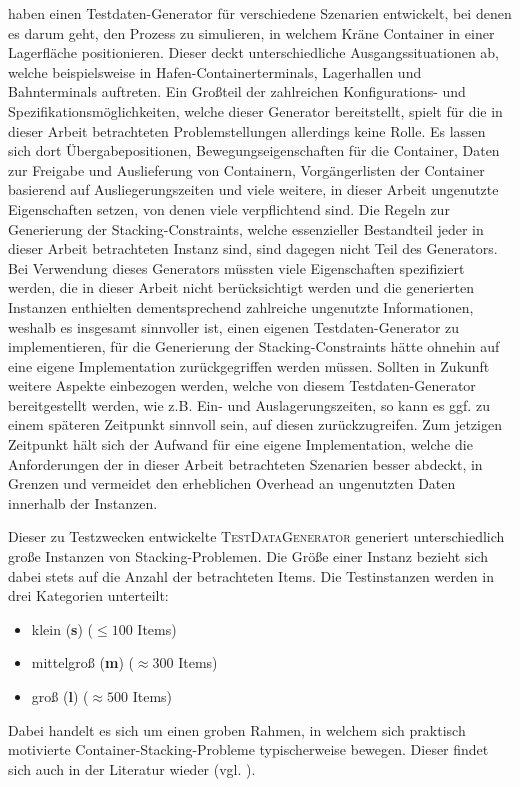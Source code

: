 \citet{Briskorn2018} haben einen Testdaten-Generator für verschiedene Szenarien entwickelt, bei denen
es darum geht, den Prozess zu simulieren, in welchem Kräne Container in einer Lagerfläche positionieren.
Dieser deckt unterschiedliche Ausgangssituationen ab, welche beispielsweise in Hafen-Containerterminals,
Lagerhallen und Bahnterminals auftreten.
Ein Großteil der zahlreichen Konfigurations- und Spezifikationsmöglichkeiten, welche dieser
Generator bereitstellt, spielt für die in dieser Arbeit betrachteten Problemstellungen allerdings keine Rolle.
Es lassen sich dort Übergabepositionen, Bewegungseigenschaften für die Container, Daten zur Freigabe und Auslieferung von
Containern, Vorgängerlisten der Container basierend auf Ausliegerungszeiten und viele weitere, in dieser Arbeit
ungenutzte Eigenschaften setzen, von denen viele verpflichtend sind. Die Regeln zur Generierung der Stacking-Constraints,
welche essenzieller Bestandteil jeder in dieser Arbeit betrachteten Instanz sind, sind dagegen nicht Teil des Generators.
Bei Verwendung dieses Generators müssten viele Eigenschaften spezifiziert werden, die in dieser Arbeit nicht
berücksichtigt werden und die generierten Instanzen enthielten dementsprechend zahlreiche ungenutzte Informationen,
weshalb es insgesamt sinnvoller ist, einen eigenen Testdaten-Generator zu implementieren, für die Generierung der
Stacking-Constraints hätte ohnehin auf eine eigene Implementation zurückgegriffen werden müssen.
Sollten in Zukunft weitere Aspekte einbezogen werden, welche von diesem Testdaten-Generator bereitgestellt
werden, wie z.B. Ein- und Auslagerungszeiten, so kann es ggf. zu einem späteren Zeitpunkt sinnvoll
sein, auf diesen zurückzugreifen. Zum jetzigen Zeitpunkt hält sich der Aufwand für eine eigene Implementation,
welche die Anforderungen der in dieser Arbeit betrachteten Szenarien besser abdeckt, in Grenzen und vermeidet den
erheblichen Overhead an ungenutzten Daten innerhalb der Instanzen.

Dieser zu Testzwecken entwickelte \textsc{TestDataGenerator} generiert unterschiedlich große Instanzen von Stacking-Problemen.
Die Größe einer Instanz bezieht sich dabei stets auf die Anzahl der betrachteten Items. Die Testinstanzen werden
in drei Kategorien unterteilt:
\begin{itemize}
  \item klein (\textbf{s}) ($\leq 100$ Items)
  \item mittelgroß (\textbf{m}) ($\approx 300$ Items)
  \item groß (\textbf{l}) ($\approx 500$ Items)\newline
\end{itemize}
Dabei handelt es sich um einen groben Rahmen, in welchem sich praktisch motivierte Container-Stacking-Probleme
typischerweise bewegen. Dieser findet sich auch in der Literatur wieder (vgl. \citet{Le2016}).

